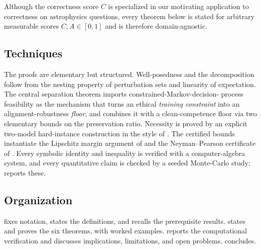 Although the correctness score $C$ is specialized in our motivating application to
correctness on astrophysics questions, every theorem below is stated for arbitrary
measurable scores $C,A\in[0,1]$ and is therefore domain-agnostic.

\subsection{Techniques}
The proofs are elementary but structured. Well-posedness and the decomposition
follow from the nesting property of perturbation sets and linearity of
expectation. The central separation theorem imports constrained-Markov-decision-
process feasibility \cite{Achiam2017} as the mechanism that turns an ethical
\emph{training constraint} into an alignment-robustness \emph{floor}, and combines
it with a clean-competence floor via two elementary bounds on the preservation
ratio. Necessity is proved by an explicit two-model hard-instance construction in
the style of \cite{Tsipras2018}. The certified bounds instantiate the Lipschitz
margin argument of \cite{Weng2018} and the Neyman--Pearson certificate of
\cite{Cohen2019}. Every symbolic identity and inequality is verified with a
computer-algebra system, and every quantitative claim is checked by a seeded
Monte-Carlo study;  reports these.

\subsection{Organization}
 fixes notation, states the definitions, and recalls the
prerequisite results.  states and proves the six theorems, with
worked examples.  reports the computational verification and
discusses implications, limitations, and open problems. 
concludes.

